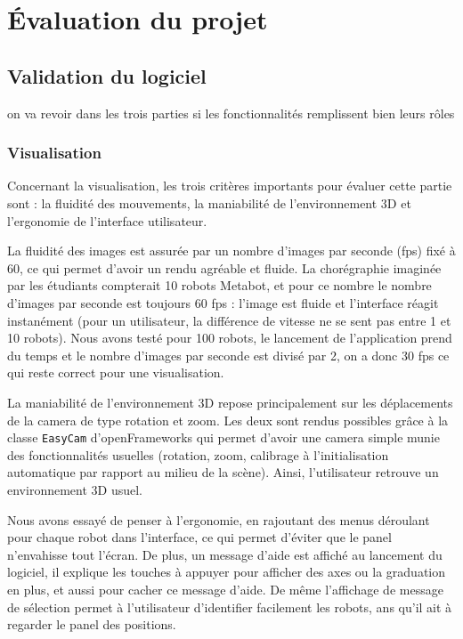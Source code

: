 \section{Évaluation du projet}
\subsection{Validation du logiciel} %

on va revoir dans les trois parties si les fonctionnalités remplissent bien leurs rôles
\subsubsection{Visualisation}

Concernant la visualisation, les trois critères importants pour évaluer cette partie sont : la fluidité des mouvements, la maniabilité de l'environnement 3D et l'ergonomie de l'interface utilisateur. 

La fluidité des images est assurée par un nombre d'images par seconde (fps) fixé à 60, ce qui permet d'avoir un rendu agréable et fluide. La chorégraphie imaginée par les étudiants compterait 10 robots Metabot, et pour ce nombre le nombre d'images par seconde est toujours 60 fps : l'image est fluide et l'interface réagit instanément (pour un utilisateur, la différence de vitesse ne se sent pas entre 1 et 10 robots).
Nous avons testé pour 100 robots, le lancement de l'application prend du temps et le nombre d'images par seconde est divisé par 2, on a donc 30 fps ce qui reste correct pour une visualisation. 

La maniabilité de l'environnement 3D repose principalement sur les déplacements de la camera de type rotation et zoom. Les deux sont rendus possibles grâce à la classe \verb|EasyCam| d'openFrameworks qui permet d'avoir une camera simple munie des fonctionnalités usuelles (rotation, zoom, calibrage à l'initialisation automatique par rapport au milieu de la scène). Ainsi, l'utilisateur retrouve un environnement 3D usuel.

Nous avons essayé de penser à l'ergonomie, en rajoutant des menus déroulant pour chaque robot dans l'interface, ce qui permet d'éviter que le panel n'envahisse tout l'écran. De plus, un message d'aide est affiché au lancement du logiciel, il explique les touches à appuyer pour afficher des axes ou la graduation en plus, et aussi pour cacher ce message d'aide.
De même l'affichage de message de sélection permet à l'utilisateur d'identifier facilement les robots,  ans qu'il ait à regarder le panel des positions.

